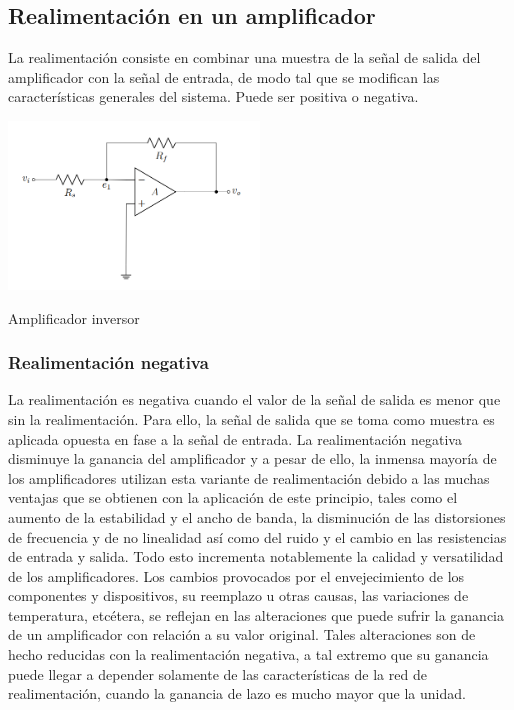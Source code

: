 \subsection{Realimentación en un amplificador}

La realimentación consiste en combinar una muestra de la señal de salida del amplificador
con la señal de entrada, de modo tal que se modifican las características generales del
sistema. Puede ser positiva o negativa.


\begin{ilustracion}[ht]
    \centering
    \includegraphics[width=0.5\textwidth]{src/images/marco-teorico/amplificador-inversor.png}
    \caption{Amplificador inversor}
    \label{ilus:mt-amplificador-inversor}
\end{ilustracion}


\subsubsection{Realimentación negativa}

La realimentación es negativa cuando el valor de la señal de salida es menor que sin la
realimentación. Para ello, la señal de salida que se toma como muestra es aplicada opuesta
en fase a la señal de entrada.
La realimentación negativa disminuye la ganancia del amplificador y a pesar de ello, la
inmensa mayoría de los amplificadores utilizan esta variante de realimentación debido a las
muchas ventajas que se obtienen con la aplicación de este principio, tales como el aumento
de la estabilidad y el ancho de banda, la disminución de las distorsiones de frecuencia y de
no linealidad así como del ruido y el cambio en las resistencias de entrada y salida. Todo
esto incrementa notablemente la calidad y versatilidad de los amplificadores.
Los cambios provocados por el envejecimiento de los componentes y dispositivos, su
reemplazo u otras causas, las variaciones de temperatura, etcétera, se reflejan en las alteraciones que puede sufrir la ganancia de un amplificador con relación a su valor original. Tales
alteraciones son de hecho reducidas con la realimentación negativa, a tal extremo que su ganancia puede llegar a depender solamente de las características de la red de realimentación,
cuando la ganancia de lazo es mucho mayor que la unidad.

